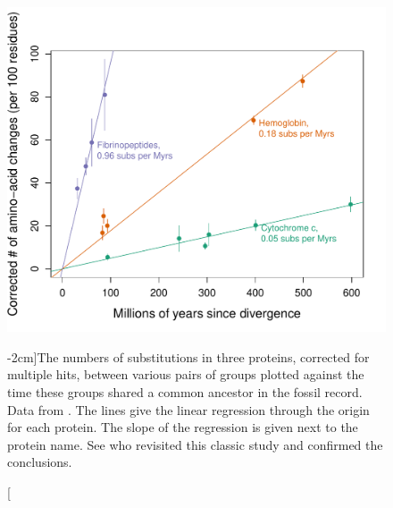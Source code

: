 \begin{figure}
\begin{center}
\includegraphics[width=0.8 \textwidth]{Journal_figs/genetic_drift/Molecular_clock_Dickerson/Dickerson_1979_mole_clock_fig.pdf}
\end{center}
\caption[][-2cm]{The numbers of substitutions in three proteins, corrected for multiple hits, between various pairs of groups plotted against the time these groups shared a common ancestor in the fossil record. Data from  \citet{dickerson1971structure}.  The lines give the linear regression through the origin for each protein. The slope of the regression is given next to the protein name.  See \citep{robinson2016revisiting} who revisited this classic study and confirmed the conclusions.} \label{fig:Dickerson_mole_clock}
\end{figure}

